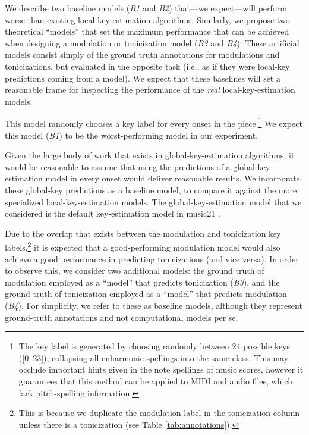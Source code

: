 
We describe two baseline models (\emph{B1} and \emph{B2})
that---we expect---will perform worse than existing
local-key-estimation algorithms. Similarly, we propose two
theoretical ``models'' that set the maximum performance that
can be achieved when designing a modulation or tonicization
model (\emph{B3} and \emph{B4}). These artificial models
consist simply of the ground truth annotations for
modulations and tonicizations, but evaluated in the opposite
task (i.e., as if they were local-key predictions coming
from a model). We expect that these baselines will set a
reasonable frame for inspecting the performance of the
\emph{real} local-key-estimation models.

This model randomly chooses a key label for every onset in
the piece.\footnote{
    The key label is generated by choosing randomly between
    24 possible keys ([0--23]), collapsing all enharmonic
    spellings into the same class. This may occlude
    important hints given in the note spellings of music
    scores, however it guarantees that this method can be
    applied to MIDI and audio files, which lack
    pitch-spelling information.} We expect this model
    (\emph{B1}) to be the worst-performing model in our
    experiment.

Given the large body of work that exists in
global-key-estimation algorithms, it would be reasonable to
assume that using the predictions of a global-key-estimation
model in every onset would deliver reasonable results. We
incorporate these global-key predictions as a baseline
model, to compare it against the more specialized
local-key-estimation models. The global-key-estimation model
that we considered is the default key-estimation model in
music21 \cite{cuthbert2010music21}.


Due to the overlap that exists between the modulation and
tonicization key labels,\footnote{This is because we
duplicate the modulation label in the tonicization column
unless there is a tonicization (see Table
\ref{tab:annotations}).} it is expected that a
good-performing modulation model would also achieve a good
performance in predicting tonicizations (and vice versa). In
order to observe this, we consider two additional models:
the ground truth of modulation employed as a ``model'' that
predicts tonicization (\emph{B3}), and the ground truth of
tonicization employed as a ``model'' that predicts
modulation (\emph{B4}). For simplicity, we refer to these as
baseline models, although they represent ground-truth
annotations and not computational models per se.

